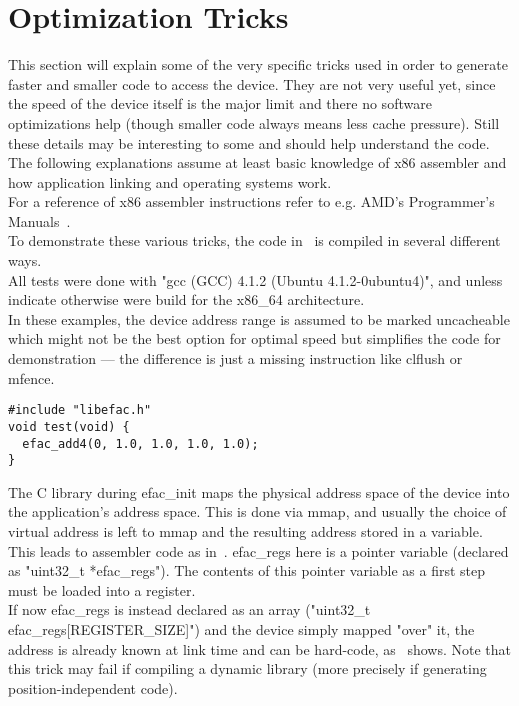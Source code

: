 \section{Optimization Tricks}
This section will explain some of the very specific tricks used in
order to generate faster and smaller code to access the device.
They are not very useful yet, since the speed of the device itself
is the major limit and there no software optimizations help (though smaller
code always means less cache pressure).
Still these details may be interesting to some and should help
understand the code.\\
The following explanations assume at least basic knowledge of x86
assembler and how application linking and operating systems work.\\
For a reference of x86 assembler instructions refer to e.g. AMD's
Programmer's Manuals~\cite{amdinstr}.\\
To demonstrate these various tricks, the code in~
is compiled in several different ways.\\
All tests were done with "gcc (GCC) 4.1.2 (Ubuntu 4.1.2-0ubuntu4)",
and unless indicate otherwise were build for the x86\_64 architecture.\\
In these examples, the device address range is assumed to be marked
uncacheable which might not be the best option for optimal speed but
simplifies the code for demonstration --- the difference is just a
missing instruction like clflush or mfence.\\


\begin{lstlisting}[float=ht,caption=compilation demonstration code,label=lst:demo]
#include "libefac.h"
void test(void) {
  efac_add4(0, 1.0, 1.0, 1.0, 1.0);
}
\end{lstlisting}


The C library during efac\_init maps the physical address space of the
device into the application's address space. This is done via mmap,
and usually the choice of virtual address is left to mmap and the
resulting address stored in a variable.\\
This leads to assembler code as in~. efac\_regs
here is a pointer variable (declared as "uint32\_t *efac\_regs").
The contents of this pointer variable as a first step must be loaded
into a register.\\
If now efac\_regs is instead declared as an array
("uint32\_t efac\_regs[REGISTER\_SIZE]") and the device simply mapped
"over" it, the address is already known at link time and can be hard-code,
as~ shows. Note that this trick may fail if compiling
a dynamic library (more precisely if generating position-independent code).\\

